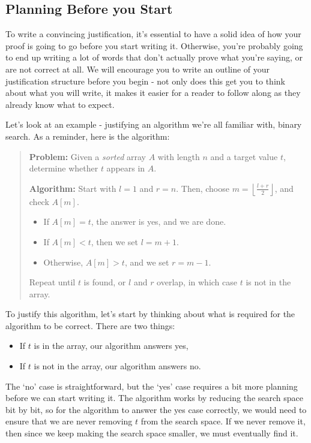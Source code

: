 \documentclass[12pt]{article}
\begin{document}

\begin{question}
\section*{Planning Before you Start}
To write a convincing justification, it's essential to have a solid idea of how your proof is going to go before you start writing it. Otherwise, you're probably going to end up writing a lot of words that don't actually prove what you're saying, or are not correct at all. We will encourage you to write an outline of your justification structure before you begin - not only does this get you to think about what you will write, it makes it easier for a reader to follow along as they already know what to expect.

Let's look at an example - justifying an algorithm we're all familiar with, binary search. As a reminder, here is the algorithm:
\begin{quote}
    \textbf{Problem:} Given a \textit{sorted} array $A$ with length $n$ and a target value $t$, determine whether $t$ appears in $A$.

    \textbf{Algorithm:} Start with $l = 1$ and $r = n$. Then, choose $m = \left\lfloor\frac{l+r}{2}\right\rfloor$, and check $A[m]$.
    \begin{itemize}
        \item If $A[m] = t$, the answer is yes, and we are done.
        \item If $A[m] < t$, then we set $l = m + 1$.
        \item Otherwise, $A[m] > t$, and we set $r = m - 1$.
    \end{itemize}
    Repeat until $t$ is found, or $l$ and $r$ overlap, in which case $t$ is not in the array.
\end{quote}

To justify this algorithm, let's start by thinking about what is required for the algorithm to be correct. There are two things:
\begin{itemize}
    \item If $t$ is in the array, our algorithm answers yes,
    \item If $t$ is not in the array, our algorithm answers no.
\end{itemize}
The `no' case is straightforward, but the `yes' case requires a bit more planning before we can start writing it. The algorithm works by reducing the search space bit by bit, so for the algorithm to answer the yes case correctly, we would need to ensure that we are never removing $t$ from the search space. If we never remove it, then since we keep making the search space smaller, we must eventually find it.


\end{question}
\end{document}
